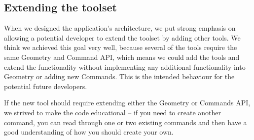 \subsection{Extending the toolset}

When we designed the application's architecture, we put strong emphasis on allowing a potential developer to extend the toolset by adding other tools. We think we achieved this goal very well, because several of the tools require the same Geometry and Command API, which means we could add the tools and extend the functionality without implementing any additional functionality into Geometry or adding new Commands. This is the intended behaviour for the potential future developers.

If the new tool should require extending either the Geometry or Commands API, we strived to make the code educational -- if you need to create another command, you can read through one or two existing commands and then have a good understanding of how you should create your own.